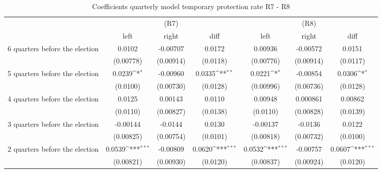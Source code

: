 \begin{table}[!ht]\centering \footnotesize
\def\sym#1{\ifmmode^{#1}\else\(^{#1}\)\fi}
\caption{Coefficients quarterly model temporary protection rate R7 - R8}
\begin{tabular}{l*{6}{c}}
\hline\hline
                    &\multicolumn{3}{c}{(R7)}&\multicolumn{3}{c}{(R8)}\\
&\multicolumn{1}{c}{left}&\multicolumn{1}{c}{right}&\multicolumn{1}{c}{diff}&\multicolumn{1}{c}{left}&\multicolumn{1}{c}{right}&\multicolumn{1}{c}{diff}\\
\hline
 6 quarters before the election&      0.0102         &    -0.00707         &      0.0172         &     0.00936         &    -0.00572         &      0.0151         \\
                    &   (0.00778)         &   (0.00914)         &    (0.0118)         &   (0.00776)         &   (0.00914)         &    (0.0117)         \\
[0,5em]
 5 quarters before the election&      0.0239\sym{*}  &    -0.00960         &      0.0335\sym{**} &      0.0221\sym{*}  &    -0.00854         &      0.0306\sym{*}  \\
                    &    (0.0100)         &   (0.00730)         &    (0.0128)         &   (0.00996)         &   (0.00736)         &    (0.0128)         \\
[0,5em]
 4 quarters before the election&      0.0125         &     0.00143         &      0.0110         &     0.00948         &    0.000861         &     0.00862         \\
                    &    (0.0110)         &   (0.00827)         &    (0.0138)         &    (0.0110)         &   (0.00828)         &    (0.0139)         \\
[0,5em]
 3 quarters before the election&    -0.00144         &     -0.0144         &      0.0130         &    -0.00137         &     -0.0136         &      0.0122         \\
                    &   (0.00825)         &   (0.00754)         &    (0.0101)         &   (0.00818)         &   (0.00732)         &    (0.0100)         \\
[0,5em]
 2 quarters before the election&      0.0539\sym{***}&    -0.00809         &      0.0620\sym{***}&      0.0532\sym{***}&    -0.00757         &      0.0607\sym{***}\\
                    &   (0.00821)         &   (0.00930)         &    (0.0120)         &   (0.00837)         &   (0.00924)         &    (0.0120)         \\

\end{tabular}
\end{table}
